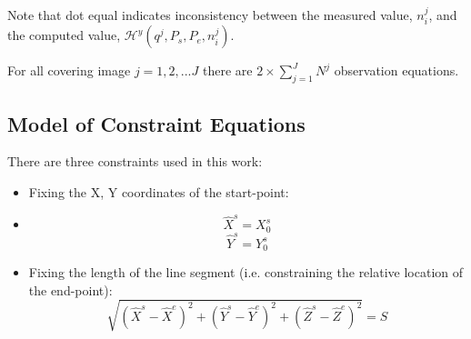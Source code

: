 Note that dot equal indicates inconsistency between the measured value, $n^j_i$, and the computed value, $\mathcal{H}^y(q^j,P_s,P_e,n^j_i)$.

For all covering image $j=1,2,...J$ there are $2\times\displaystyle\sum_{j=1}^{J}N^j$ observation equations.



\subsection{Model of Constraint Equations}
\label{subsec:ConEqua}
There are three constraints used in this work:
\begin{itemize}
\item Fixing the X, Y coordinates of the start-point:
\item [] \begin{equation} \label{eq:constraint1}
\hat{X}^s=X^s_0
\end{equation}
\begin{equation} \label{eq:constraint2}
\hat{Y}^s=Y^s_0
\end{equation}
\item Fixing the length of the line segment (i.e. constraining the relative location of the end-point):
\begin{equation} \label{eq:constraint3}
\sqrt{(\hat{X}^s-\hat{X}^e)^2+(\hat{Y}^s-\hat{Y}^e)^2+(\hat{Z}^s-\hat{Z}^e)^2}=S
\end{equation}
\end{itemize}

